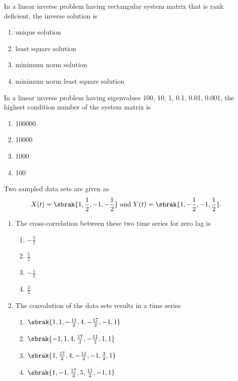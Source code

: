     \item In a linear inverse problem having rectangular system matrix that is rank deficient, the inverse solution is
    \hfill{}
    \begin{multicols}{2}
        \begin{enumerate}
            \item unique solution
            \item least square solution
            \item minimum norm solution
            \item minimum norm least square solution
        \end{enumerate}
    \end{multicols}
    \item In a linear inverse problem having eigenvalues 100, 10, 1, 0.1, 0.01, 0.001, the highest condition number of the system matrix is
    \hfill{}
    \begin{multicols}{4}
        \begin{enumerate}
            \item 100000
            \item 10000
            \item 1000
            \item 100
        \end{enumerate}
    \end{multicols}
    \item Two sampled data sets are given as 
    \hfill{}
	    $$X(t) = \sbrak{1, \frac{1}{2}, -1, -\frac{1}{2}} \text{ and } Y(t) = \sbrak{1, -\frac{1}{2}, -1, \frac{1}{2}}.$$
        \begin{enumerate}
    \item The cross-correlation between these two time series for zero lag is
    \begin{multicols}{4}
        \begin{enumerate}
            \item $-\frac{3}{2}$
            \item $\frac{5}{2}$
            \item $-\frac{1}{2}$
            \item $\frac{3}{2}$
        \end{enumerate}
    \end{multicols}
    \item The convolution of the data sets results in a time series
    \begin{multicols}{2}
	    \begin{enumerate}[itemsep=1ex]
            \item $\sbrak{1, 1, -\frac{11}{2}, 4, -\frac{17}{2}, -1, 1}$
            \item $\sbrak{-1, 1, 4, \frac{17}{2}, -\frac{11}{2}, 1, 1}$
            \item $\sbrak{1, \frac{17}{2}, 4, -\frac{11}{2}, -1, \frac{3}{2}, 1}$
            \item $\sbrak{1, -1, \frac{17}{2}, 5, \frac{11}{2}, -1, 1}$
        \end{enumerate}
    \end{multicols}
        \end{enumerate}
